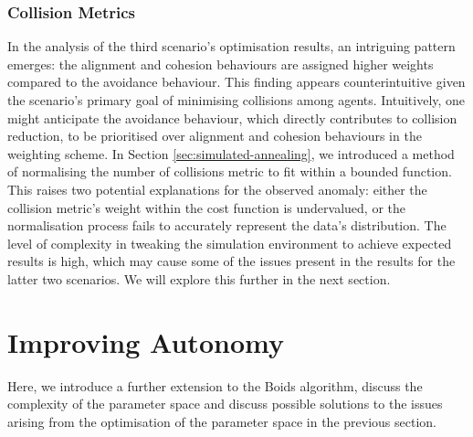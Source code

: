 \documentclass[12pt]{article}
\begin{document}
\subsubsection{Collision Metrics}
In the analysis of the third scenario's optimisation results, an intriguing pattern emerges: the alignment and cohesion behaviours are assigned higher weights compared to the avoidance behaviour. This finding appears counterintuitive given the scenario's primary goal of minimising collisions among agents. Intuitively, one might anticipate the avoidance behaviour, which directly contributes to collision reduction, to be prioritised over alignment and cohesion behaviours in the weighting scheme. In Section \ref{sec:simulated-annealing}, we introduced a method of normalising the number of collisions metric to fit within a bounded function. This raises two potential explanations for the observed anomaly: either the collision metric's weight within the cost function is undervalued, or the normalisation process fails to accurately represent the data's distribution. The level of complexity in tweaking the simulation environment to achieve expected results is high, which may cause some of the issues present in the results for the latter two scenarios. We will explore this further in the next section.

\newpage
\section{Improving Autonomy}
Here, we introduce a further extension to the Boids algorithm, discuss the complexity of the parameter space and discuss possible solutions to the issues arising from the optimisation of the parameter space in the previous section.
\end{document}

